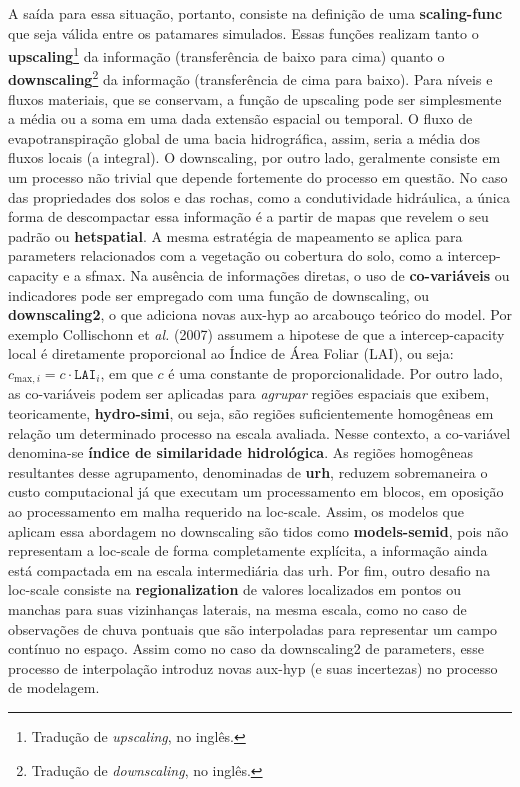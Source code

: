 \documentclass[./main.tex]{subfiles}
\begin{document}
\par A saída para essa situação, portanto, consiste na definição de uma \textbf{\gls{scaling-func}} que seja válida entre os patamares simulados. Essas funções realizam tanto o \textbf{\gls{upscaling}}\footnote{Tradução de \textit{upscaling}, no inglês.} da informação (transferência de baixo para cima) quanto o \textbf{\gls{downscaling}}\footnote{Tradução de \textit{downscaling}, no inglês.} da informação (transferência de cima para baixo). Para níveis e fluxos materiais, que se conservam, a função de \gls{upscaling} pode ser simplesmente a média ou a soma em uma dada extensão espacial ou temporal. O fluxo de evapotranspiração global de uma bacia hidrográfica, assim, seria a média dos fluxos locais (a integral). O \gls{downscaling}, por outro lado, geralmente consiste em um processo não trivial que depende fortemente do processo em questão. No caso das propriedades dos solos e das rochas, como a condutividade hidráulica, a única forma de descompactar essa informação é a partir de mapas que revelem o seu padrão ou \textbf{\gls{hetspatial}}. A mesma estratégia de mapeamento se aplica para \gls{parameters} relacionados com a vegetação ou cobertura do solo, como a \gls{intercep-capacity} e a \gls{sfmax}. Na ausência de informações diretas, o uso de \textbf{co-variáveis} ou indicadores pode ser empregado com uma função de \gls{downscaling}, ou \textbf{\gls{downscaling2}}, o que adiciona novas \gls{aux-hyp} ao arcabouço teórico do \gls{model}. Por exemplo Collischonn et \textit{al.} (2007) \cite{Collischonn2007} assumem a \gls{hipotese} de que a \gls{intercep-capacity} local é diretamente proporcional ao Índice de Área Foliar (LAI), ou seja: $c_{\text{max}, i} = c \cdot \texttt{LAI}_{i}$, em que $c$ é uma constante de proporcionalidade. Por outro lado, as co-variáveis podem ser aplicadas para \textit{agrupar} regiões espaciais que exibem, teoricamente, \textbf{\gls{hydro-simi}}, ou seja, são regiões suficientemente homogêneas em relação um determinado processo na escala avaliada. Nesse contexto, a co-variável denomina-se \textbf{índice de similaridade hidrológica}. As regiões homogêneas resultantes desse agrupamento, denominadas de \textbf{\gls{urh}}, reduzem sobremaneira o custo computacional já que executam um processamento em blocos, em oposição ao processamento em malha requerido na \gls{loc-scale}. Assim, os modelos que aplicam essa abordagem no \gls{downscaling} são tidos como \textbf{\gls{models-semid}}, pois não representam a \gls{loc-scale} de forma completamente explícita, a informação ainda está compactada em na escala intermediária das \gls{urh}. Por fim, outro desafio na \gls{loc-scale} consiste na \textbf{\gls{regionalization}} de valores localizados em pontos ou manchas para suas vizinhanças laterais, na mesma escala, como no caso de observações de chuva pontuais que são interpoladas para representar um campo contínuo no espaço. Assim como no caso da \gls{downscaling2} de \gls{parameters}, esse processo de interpolação introduz novas \gls{aux-hyp} (e suas incertezas) no processo de modelagem.
\end{document}
